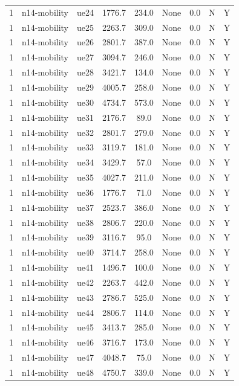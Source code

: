 \begin{table}[ht]
\begin{tabular}{|c|c|c|c|c|c|c|c|c|}
1 & n14-mobility & ue24 & 1776.7 & 234.0 & None & 0.0 & N & Y \\
1 & n14-mobility & ue25 & 2263.7 & 309.0 & None & 0.0 & N & Y \\
1 & n14-mobility & ue26 & 2801.7 & 387.0 & None & 0.0 & N & Y \\
1 & n14-mobility & ue27 & 3094.7 & 246.0 & None & 0.0 & N & Y \\
1 & n14-mobility & ue28 & 3421.7 & 134.0 & None & 0.0 & N & Y \\
1 & n14-mobility & ue29 & 4005.7 & 258.0 & None & 0.0 & N & Y \\
1 & n14-mobility & ue30 & 4734.7 & 573.0 & None & 0.0 & N & Y \\
1 & n14-mobility & ue31 & 2176.7 & 89.0 & None & 0.0 & N & Y \\
1 & n14-mobility & ue32 & 2801.7 & 279.0 & None & 0.0 & N & Y \\
1 & n14-mobility & ue33 & 3119.7 & 181.0 & None & 0.0 & N & Y \\
1 & n14-mobility & ue34 & 3429.7 & 57.0 & None & 0.0 & N & Y \\
1 & n14-mobility & ue35 & 4027.7 & 211.0 & None & 0.0 & N & Y \\
1 & n14-mobility & ue36 & 1776.7 & 71.0 & None & 0.0 & N & Y \\
1 & n14-mobility & ue37 & 2523.7 & 386.0 & None & 0.0 & N & Y \\
1 & n14-mobility & ue38 & 2806.7 & 220.0 & None & 0.0 & N & Y \\
1 & n14-mobility & ue39 & 3116.7 & 95.0 & None & 0.0 & N & Y \\
1 & n14-mobility & ue40 & 3714.7 & 258.0 & None & 0.0 & N & Y \\
1 & n14-mobility & ue41 & 1496.7 & 100.0 & None & 0.0 & N & Y \\
1 & n14-mobility & ue42 & 2263.7 & 442.0 & None & 0.0 & N & Y \\
1 & n14-mobility & ue43 & 2786.7 & 525.0 & None & 0.0 & N & Y \\
1 & n14-mobility & ue44 & 2806.7 & 114.0 & None & 0.0 & N & Y \\
1 & n14-mobility & ue45 & 3413.7 & 285.0 & None & 0.0 & N & Y \\
1 & n14-mobility & ue46 & 3716.7 & 173.0 & None & 0.0 & N & Y \\
1 & n14-mobility & ue47 & 4048.7 & 75.0 & None & 0.0 & N & Y \\
1 & n14-mobility & ue48 & 4750.7 & 339.0 & None & 0.0 & N & Y \\

\end{tabular}
\end{table}
